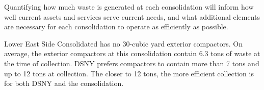 
    Quantifying how much waste is generated at each consolidation will inform how well current assets and services serve current needs, and what additional elements are necessary for each consolidation to operate as efficiently as possible.
    
    Lower East Side Consolidated has no 30-cubic yard exterior compactors. On average, the exterior compactors at this consolidation contain 6.3 tons of waste at the time of collection. DSNY prefers compactors to contain more than 7 tons and up to 12 tons at collection. The closer to 12 tons, the more efficient collection is for both DSNY and the consolidation.